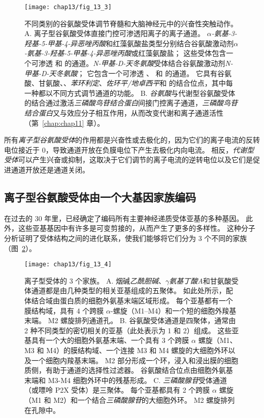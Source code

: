 \begin{figure}[htbp]
	\centering
	\texttt{[image: chap13/fig\_13\_3]}
	\caption{不同类别的谷氨酸受体调节脊髓和大脑神经元中的兴奋性突触动作。
		A. 离子型谷氨酸受体直接门控可渗透阳离子的离子通道。
		\textit{$\alpha$-氨基-3-羟基-5-甲基-4-异恶唑丙酸}和红藻氨酸盐类型分别结合谷氨酸激动剂\textit{$\alpha$-氨基-3-羟基-5-甲基-4-异恶唑丙酸}或红藻氨酸盐；
		这些受体包含一个可渗透  和  的通道。\textit{N-甲基-D-天冬氨酸}受体结合谷氨酸激动剂\textit{N-甲基-D-天冬氨酸}；
		它包含一个可渗透 、 和  的通道。
		它具有谷氨酸、甘氨酸、、\textit{苯环利定}、\textit{佐环平/地卓西平}和  的结合位点，其中每一种都以不同方式调节通道的功能。
		B. \textit{谷氨酸}与代谢型谷氨酸受体的结合通过激活\textit{三磷酸鸟苷结合蛋白}间接门控离子通道，\textit{三磷酸鸟苷结合蛋白}又与效应分子相互作用，从而改变代谢和离子通道活性（第~\ref{chap:chap11} 章）。}
	\label{fig:13_3}
\end{figure}


所有\textit{离子型谷氨酸受体}的作用都是兴奋性或去极化的，因为它们的离子电流的反转电位接近于 0，导致通道开放在负膜电位下产生去极化内向电流。
相反，\textit{代谢型受体}可以产生兴奋或抑制，这取决于它们调节的离子电流的逆转电位以及它们是促进通道开放还是通道关闭。



\subsection{离子型谷氨酸受体由一个大基因家族编码}

在过去的 30 年里，已经确定了编码所有主要神经递质受体亚基的多种基因。
此外，这些亚基基因中有许多是可变剪接的，从而产生了更多的多样性。
这种分子分析证明了受体结构之间的进化联系，使我们能够将它们分为 3 个不同的家族（图~\ref{fig:13_4}）。


\begin{figure}[htbp]
	\centering
	\texttt{[image: chap13/fig\_13\_4]}
	\caption{离子型受体的 3 个家族。
		A. 烟碱\textit{乙酰胆碱}、\textit{$\gamma$氨基丁酸A}和甘氨酸受体通道都是由几种类型的相关亚基组成的五聚体。
		如此处所示，配体结合域由蛋白质的细胞外氨基末端区域形成。
		每个亚基都有一个膜结构域，具有 4 个跨膜 $\alpha$-螺旋（M1–M4）和一个短的细胞外羧基末端。
		M2 螺旋排列通道孔。
		B. 谷氨酸受体通道是四聚体，通常由 2 种不同类型的密切相关的亚基（此处表示为 1 和 2）组成。
		这些亚基具有一个大的细胞外氨基末端、一个具有 3 个跨膜 $\alpha$ 螺旋（M1、M3 和 M4）的膜结构域、一个连接 M3 和 M4 螺旋的大细胞外环以及一个细胞内羧基末端。
		M2 部分形成一个环，浸入和浸出膜的细胞质侧，有助于通道的选择性过滤器。
		谷氨酸结合位点由细胞外氨基末端和 M3-M4 细胞外环中的残基形成。
		C. \textit{三磷酸腺苷}受体通道（或嘌呤 P2X 受体）是三聚体。
		每个亚基都具有 2 个跨膜 $\alpha$ 螺旋（M1 和 M2）和一个结合\textit{三磷酸腺苷}的大细胞外环。
		M2 螺旋排列在孔隙中。}
	\label{fig:13_4}
\end{figure}


